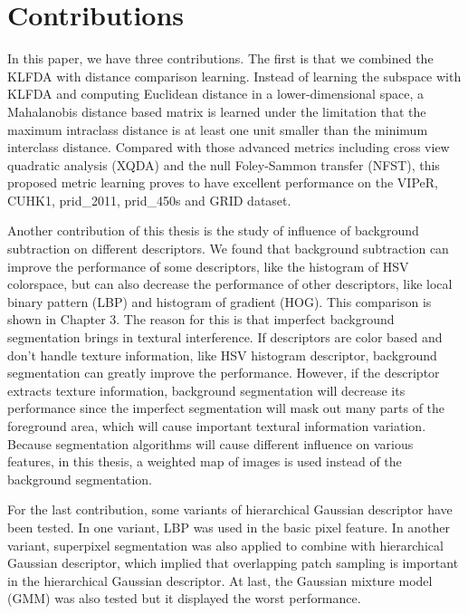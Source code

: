 \section{Contributions}

In this paper, we have three contributions. The first is that we combined the KLFDA with distance comparison learning. Instead of learning the subspace with KLFDA and computing Euclidean distance in a lower-dimensional space, a Mahalanobis distance based matrix is learned under the limitation that the maximum intraclass distance is at least one unit smaller than the minimum interclass distance. Compared with those advanced metrics including cross view quadratic analysis (XQDA) \cite{LOMO} and the null Foley-Sammon transfer (NFST), this proposed metric learning proves to have excellent performance on the VIPeR, CUHK1, prid\_2011, prid\_450s and GRID dataset.

Another contribution of this thesis is the study of influence of background subtraction on different descriptors. We found that background subtraction can improve the performance of some descriptors, like the histogram of HSV colorspace, but can also decrease the performance of  other descriptors, like local binary pattern (LBP) and histogram of gradient (HOG). This comparison is shown in Chapter 3. The reason for this is that imperfect background segmentation brings in textural interference. If descriptors are color based and don't handle texture information, like HSV histogram descriptor, background segmentation can greatly improve the performance. However, if the descriptor extracts texture information, background segmentation will decrease its performance since the imperfect segmentation will mask out many parts of the foreground area, which will cause important textural information variation. Because segmentation algorithms will cause different influence on various features, in this thesis, a weighted map of images is used instead of the background segmentation.

For the last contribution, some variants of hierarchical Gaussian descriptor have been tested. In one variant, LBP was used in the basic pixel feature. In another variant, superpixel segmentation was also applied to combine with hierarchical Gaussian descriptor, which implied that overlapping patch sampling is important in the hierarchical Gaussian descriptor. At last, the Gaussian mixture model (GMM) was also tested but it displayed the worst performance.

